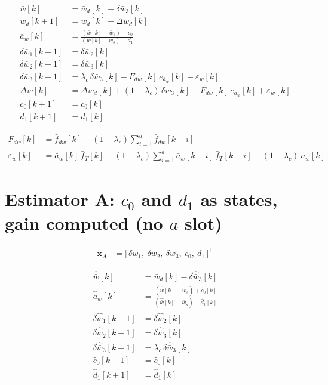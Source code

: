 \documentclass[11pt,a4paper,fontset=none]{ctexart}
\newcommand{\ba}{\bar{a}}
\newcommand{\bw}{\bar{w}}
\newcommand{\dW}{\Delta\bw}
\newcommand{\ah}{\hat{\ba}_w}
\newcommand{\ch}{\hat{c}_0}
\newcommand{\dhat}{\hat{d}_1}
\newcommand{\wh}{\hat{\bw}}
\begin{document}
\begin{align*}
\bw[k]           &= \bw_d[k] - \delta\bw_3[k] \\
\bw_d[k+1]       &= \bw_d[k] + \Delta\bw_d[k] \\
\ba_w[k]         &= \frac{(\bw[k] - \bw_s) + c_0}{(\bw[k] - \bw_s) + d_1} \\
\delta\bw_1[k+1] &= \delta\bw_2[k] \\
\delta\bw_2[k+1] &= \delta\bw_3[k] \\
\delta\bw_3[k+1] &= \lambda_c\,\delta\bw_3[k] - F_{dw}[k]\,e_{\ba_w}[k] - \varepsilon_w[k] \\
\dW[k]           &= \Delta\bw_d[k] + (1-\lambda_c)\,\delta\bw_3[k] + F_{dw}[k]\,e_{\ba_w}[k] + \varepsilon_w[k] \\
c_0[k+1]         &= c_0[k] \\
d_1[k+1]         &= d_1[k]
\end{align*}

\begin{align*}
F_{dw}[k]        &= \bar f_{dw}[k] + (1-\lambda_c)\sum_{i=1}^{d}\bar f_{dw}[k-i] \\
\varepsilon_w[k] &= \ba_w[k]\,\bar f_T[k] + (1-\lambda_c)\sum_{i=1}^{d}\ba_w[k-i]\,\bar f_T[k-i] - (1-\lambda_c)\,n_w[k]
\end{align*}

\section{Estimator A: $c_0$ and $d_1$ as states, gain computed (no $a$ slot)}

\begin{align*}
\mathbf{x}_A &= \bigl[\,\delta\bw_1,\ \delta\bw_2,\ \delta\bw_3,\ c_0,\ d_1\,\bigr]^{\top}
\end{align*}

\begin{align*}
\wh[k]                 &= \bw_d[k] - \delta\hat{\bw}_3[k] \\
\ah[k]                 &= \frac{(\wh[k] - \bw_s) + \ch[k]}{(\wh[k] - \bw_s) + \dhat[k]} \\
\delta\hat{\bw}_1[k+1] &= \delta\hat{\bw}_2[k] \\
\delta\hat{\bw}_2[k+1] &= \delta\hat{\bw}_3[k] \\
\delta\hat{\bw}_3[k+1] &= \lambda_c\,\delta\hat{\bw}_3[k] \\
\ch[k+1]               &= \ch[k] \\
\dhat[k+1]               &= \dhat[k]
\end{align*}
\end{document}
